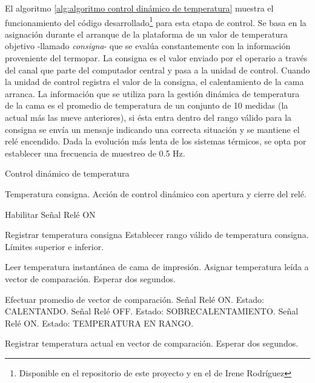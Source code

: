 El algoritmo \ref{alg:algoritmo control dinámico de temperatura} muestra el funcionamiento del código desarrollado\footnote{Disponible en el repositorio de este proyecto y en el de Irene Rodríguez\cite{repo_github_Irene_Rodriguez}} para esta etapa de control. Se basa en la asignación durante el arranque de la plataforma de un valor de temperatura objetivo -llamado \textit{consigna}- que se evalúa constantemente con la información proveniente del termopar. La consigna es el valor enviado por el operario a través del canal que parte del computador central y pasa a la unidad de control. Cuando la unidad de control registra el valor de la consigna, el calentamiento de la cama arranca. La información que se utiliza para la gestión dinámica de temperatura de la cama es el promedio de temperatura de un conjunto de 10 medidas (la actual más las nueve anteriores), si ésta entra dentro del rango válido para la consigna se envía un mensaje indicando una correcta situación y se mantiene el relé encendido. Dada la evolución más lenta de los sistemas térmicos, se opta por establecer una frecuencia de muestreo de 0.5 Hz.

\begin{algorithm}[h!]
\caption{Control dinámico de temperatura}\label{alg:algoritmo control dinámico de temperatura}
\begin{algorithmic}[1]
\Require Temperatura consigna.
\Ensure Acción de control dinámico con apertura y cierre del relé.

\State Habilitar Señal Relé ON

\State Registrar temperatura consigna
\State Establecer rango válido de temperatura consigna. Límites superior e inferior.

    \State Leer temperatura instantánea de cama de impresión.
    \State Asignar temperatura leída a vector de comparación.
    \State Esperar dos segundos.
\EndFor

\State Efectuar promedio de vector de comparación.
    \State Señal Relé ON.
    \State Estado: CALENTANDO.
\EndIf
{}
    \State Señal Relé OFF.
    \State Estado: SOBRECALENTAMIENTO.
\EndIf
{}
    \State Señal Relé ON.
    \State Estado: TEMPERATURA EN RANGO.
\EndIf

\State Registrar temperatura actual en vector de comparación.
\State Esperar dos segundos.
\EndWhile
\end{algorithmic}
\end{algorithm}

